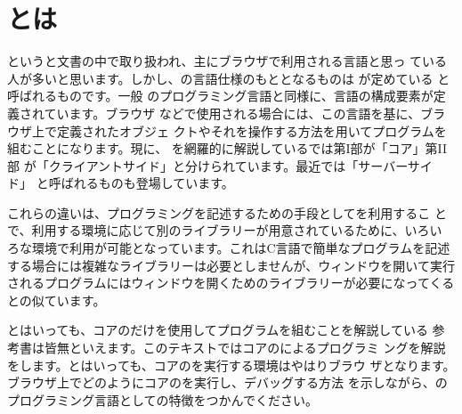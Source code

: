 \section{\JS とは}
\JS というと\HTML 文書の中で取り扱われ、主にブラウザで利用される言語と思っ
ている人が多いと思います。しかし、\JS の言語仕様のもととなるものは
が定めている  と呼ばれるものです。一般
のプログラミング言語と同様に、言語の構成要素が定義されています。ブラウザ
などで使用される場合には、この言語を基に、ブラウザ上で定義されたオブジェ
クトやそれを操作する方法を用いてプログラムを組むことになります。現に、
\JS を網羅的に解説している\cite{JavaScript}では第I部が「コア\JS」第II部
が「クライアントサイド\JS」と分けられています。最近では「サーバーサイド\JS」
と呼ばれるものも登場しています。

これらの違いは、プログラミングを記述するための手段として\JS を利用するこ
とで、利用する環境に応じて別のライブラリーが用意されているために、いろい
ろな環境で利用が可能となっています。これはC言語で簡単なプログラムを記述
する場合には複雑なライブラリーは必要としませんが、ウィンドウを開いて実行
されるプログラムにはウィンドウを開くためのライブラリーが必要になってくる
との似ています。

とはいっても、コアの\JS だけを使用してプログラムを組むことを解説している
参考書は皆無といえます。このテキストではコアの\JS によるプログラミ
ングを解説をします。とはいっても、コアの\JS を実行する環境はやはりブラウ
ザとなります。ブラウザ上でどのようにコアの\JS を実行し、デバッグする方法
を示しながら、\JS のプログラミング言語としての特徴をつかんでください。